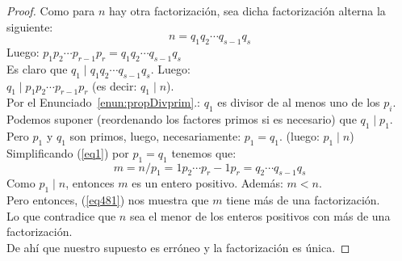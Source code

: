 \begin{proof}
Como para $n$ hay otra factorización, sea dicha factorización alterna la siguiente: 
\begin{equation}
\label{eq1}
n = q_1 q_2 \cdots q_{s-1} q_s
\end{equation}
Luego: $p_1 p_2 \cdots p_{r-1} p_r = q_1 q_2 \cdots q_{s-1} q_s$\\ 
Es claro que $q_1 \mid q_1 q_2 \cdots q_{s-1} q_s$. Luego: \\ 
$q_1 \mid p_1 p_2 \cdots p_{r-1} p_r$ (es decir: $q_1 \mid n$). \\
\setcounter{enumi}{3}
Por el Enunciado~\ref{enun:propDivprim}.: $q_1$ es divisor de al menos uno de los $p_i$. \\ 
Podemos suponer (reordenando los factores primos si es necesario) que $q_1 \mid p_1$. \\ 
Pero $p_1$ y $q_1$ son primos, luego, necesariamente: $p_1 = q_1$.    (luego:  $p_1 \mid n$) \\ 
Simplificando (\ref{eq1}) por $p_1 = q_1$ tenemos que: 
\begin{equation}
\label{eq481}
m = n/p_1 = 1 p_2 \cdots p_r-1 p_r =  q_2 \cdots q_{s-1}  q_s
\end{equation}
Como $p_1 \mid n$, entonces $m$ es un entero positivo. Además: $m < n$. \\ 
Pero entonces, (\ref{eq481}) nos muestra que $m$ tiene más de una factorización. \\ 
Lo que contradice que $n$ sea el menor de los enteros positivos con más de una factorización. \\ 
De ahí que nuestro supuesto es erróneo y la factorización es única.
\end{proof}

